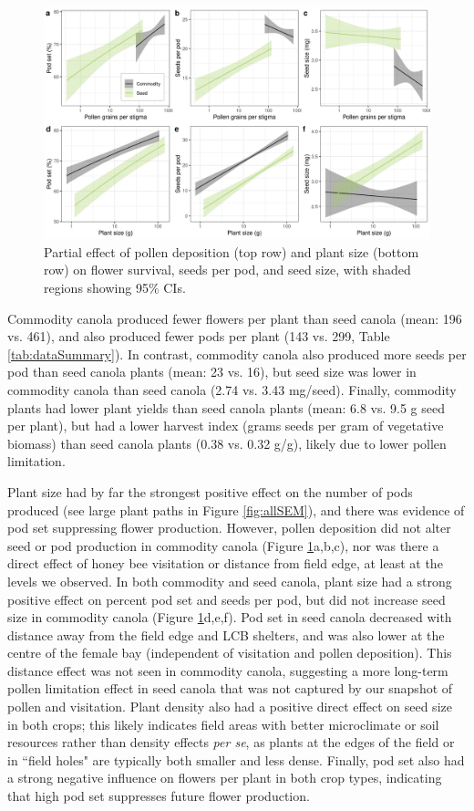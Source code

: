 \documentclass[12pt]{article} %
\begin{document}
\begin{figure}
    \centering
    \includegraphics[width=\textwidth,keepaspectratio=true]{../Figures/allSeeds.png}
    \caption{Partial effect of pollen deposition (top row) and plant size (bottom row) on flower survival, seeds per pod, and seed size, with shaded regions showing 95\% CIs.}
    \label{fig:allSeeds}
\end{figure}

Commodity canola produced fewer flowers per plant than seed canola (mean: 196 vs. 461), and also produced fewer pods per plant (143 vs. 299, Table \ref{tab:dataSummary}).
In contrast, commodity canola also produced more seeds per pod than seed canola plants (mean: 23 vs. 16), but seed size was lower in commodity canola than seed canola (2.74 vs. 3.43 mg/seed). 
Finally, commodity plants had lower plant yields than seed canola plants (mean: 6.8 vs. 9.5 g seed per plant), but had a lower harvest index (grams seeds per gram of vegetative biomass) than seed canola plants (0.38 vs. 0.32 g/g), likely due to lower pollen limitation.

Plant size had by far the strongest positive effect on the number of pods produced (see large plant paths in Figure \ref{fig:allSEM}), and there was evidence of pod set suppressing flower production.
However, pollen deposition did not alter seed or pod production in commodity canola (Figure \ref{fig:allSeeds}a,b,c), nor was there a direct effect of honey bee visitation or distance from field edge, at least at the levels we observed.
In both commodity and seed canola, plant size had a strong positive effect on percent pod set and seeds per pod, but did not increase seed size in commodity canola (Figure \ref{fig:allSeeds}d,e,f).
Pod set in seed canola decreased with distance away from the field edge and LCB shelters, and was also lower at the centre of the female bay (independent of visitation and pollen deposition).
This distance effect was not seen in commodity canola, suggesting a more long-term pollen limitation effect in seed canola that was not captured by our snapshot of pollen and visitation.
Plant density also had a positive direct effect on seed size in both crops; this likely indicates field areas with better microclimate or soil resources rather than density effects \emph{per se}, as plants at the edges of the field or in ``field holes" are typically both smaller and less dense.
Finally, pod set also had a strong negative influence on flowers per plant in both crop types, indicating that high pod set suppresses future flower production.
\end{document}
